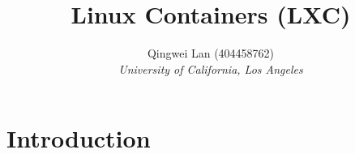\documentclass[12pt]{article}
\begin{document}
\title{Linux Containers (LXC)}
\author{Qingwei Lan (404458762)\\ \textit{University of California, Los Angeles}}
\maketitle

\section{Introduction}
\end{document}
